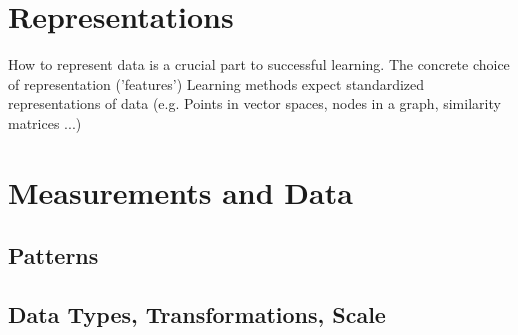 \documentclass[MachineLearning]{subfiles}
\begin{document}
\section{Representations}

How to represent data is a crucial part to successful learning. The concrete choice of representation ('features') Learning methods expect standardized representations of data (e.g. Points in vector spaces, nodes in a graph, similarity matrices ...)

\section{Measurements and Data}
\subsection{Patterns}
\subsection{Data Types, Transformations, Scale}
\end{document}
